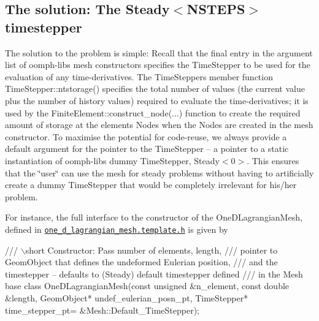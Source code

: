 \hypertarget{index_soln}{}\subsection{The solution\+: The Steady$<$\+N\+S\+T\+E\+P\+S$>$ timestepper}\label{index_soln}
The solution to the problem is simple\+: Recall that the final entry in the argument list of {\ttfamily oomph-\/lib\textquotesingle{}s} mesh constructors specifies the {\ttfamily Time\+Stepper} to be used for the evaluation of any time-\/derivatives. The {\ttfamily Time\+Stepper\textquotesingle{}s} member function {\ttfamily Time\+Stepper\+::ntstorage()} specifies the total number of values (the current value plus the number of history values) required to evaluate the time-\/derivatives; it is used by the {\ttfamily Finite\+Element\+::construct\+\_\+node}(...) function to create the required amount of storage at the elements\textquotesingle{} {\ttfamily Nodes} when the {\ttfamily Nodes} are created in the mesh constructor. To maximise the potential for code-\/reuse, we always provide a default argument for the pointer to the {\ttfamily Time\+Stepper} -- a pointer to a static instantiation of {\ttfamily oomph-\/lib\textquotesingle{}s} dummy {\ttfamily Time\+Stepper}, {\ttfamily Steady$<$0$>$}. This ensures that the \char`\"{}user\char`\"{} can use the mesh for steady problems without having to artificially create a dummy {\ttfamily Time\+Stepper} that would be completely irrelevant for his/her problem.

For instance, the full interface to the constructor of the {\ttfamily One\+D\+Lagrangian\+Mesh}, defined in \href{../../../../src/meshes/one_d_lagrangian_mesh.template.h}{\tt one\+\_\+d\+\_\+lagrangian\+\_\+mesh.\+template.\+h} is given by

 
\begin{DoxyCodeInclude}
 \textcolor{comment}{/// \(\backslash\)short Constructor: Pass number of elements, length,}
\textcolor{comment}{ /// pointer to GeomObject that defines the undeformed Eulerian position,}
\textcolor{comment}{}\textcolor{comment}{ /// and the timestepper -- defaults to (Steady) default timestepper defined}
\textcolor{comment}{}\textcolor{comment}{ /// in the Mesh base class}
\textcolor{comment}{} OneDLagrangianMesh(\textcolor{keyword}{const} \textcolor{keywordtype}{unsigned} &n\_element, 
                    \textcolor{keyword}{const} \textcolor{keywordtype}{double} &length,
                    GeomObject* undef\_eulerian\_posn\_pt, 
                    TimeStepper* time\_stepper\_pt=
                    &Mesh::Default\_TimeStepper);

\end{DoxyCodeInclude}



